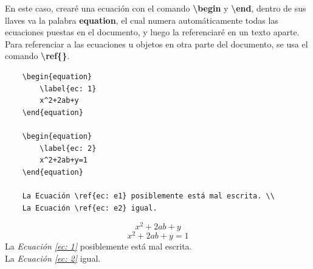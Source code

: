 En este caso, crearé una ecuación con el comando \textbf{\textbackslash{begin}} y \textbf{\textbackslash{end}}, dentro de sus llaves va la palabra \textbf{equation}, el cual numera automáticamente todas las ecuaciones puestas en el documento, y luego la referenciaré en un texto aparte. Para referenciar a las ecuaciones u objetos en otra parte del documento, se usa el comando \textbf{\textbackslash{ref\{\}}}.
\begin{lstlisting}
    \begin{equation}
        \label{ec: 1}
        x^2+2ab+y
    \end{equation}
    
    \begin{equation}
        \label{ec: 2}
        x^2+2ab+y=1
    \end{equation}
    
    La Ecuación \ref{ec: e1} posiblemente está mal escrita. \\
    La Ecuación \ref{ec: e2} igual.
\end{lstlisting}
\begin{equation}
    \label{ec: 1}
    x^2+2ab+y
\end{equation}
\begin{equation}
    \label{ec: 2}
    x^2+2ab+y=1
\end{equation}
La \textit{Ecuación \ref{ec: 1}} posiblemente está mal escrita. \\
La \textit{Ecuación \ref{ec: 2}} igual.
